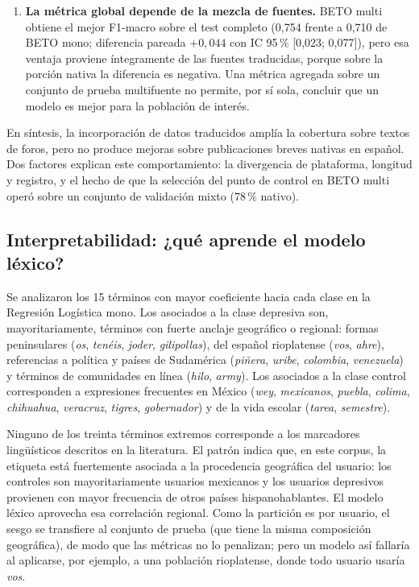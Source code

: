 \documentclass[12pt,a4paper]{article}
\begin{document}
\begin{enumerate}[leftmargin=2em]
    \item \textbf{La métrica global depende de la mezcla de fuentes.} BETO multi obtiene el mejor F1-macro sobre el test completo (0{,}754 frente a 0{,}710 de BETO mono; diferencia pareada $+0{,}044$ con IC 95\,\% [0{,}023; 0{,}077]), pero esa ventaja proviene íntegramente de las fuentes traducidas, porque sobre la porción nativa la diferencia es negativa. Una métrica agregada sobre un conjunto de prueba multifuente no permite, por sí sola, concluir que un modelo es mejor para la población de interés.
\end{enumerate}

En síntesis, la incorporación de datos traducidos amplía la cobertura sobre textos de foros, pero no produce mejoras sobre publicaciones breves nativas en español. Dos factores explican este comportamiento: la divergencia de plataforma, longitud y registro, y el hecho de que la selección del punto de control en BETO multi operó sobre un conjunto de validación mixto (78\,\% nativo).

\subsection{Interpretabilidad: ¿qué aprende el modelo léxico?}
Se analizaron los 15 términos con mayor coeficiente hacia cada clase en la Regresión Logística mono. Los asociados a la clase depresiva son, mayoritariamente, términos con fuerte anclaje geográfico o regional: formas peninsulares (\emph{os}, \emph{tenéis}, \emph{joder}, \emph{gilipollas}), del español rioplatense (\emph{vos}, \emph{ahre}), referencias a política y países de Sudamérica (\emph{piñera}, \emph{uribe}, \emph{colombia}, \emph{venezuela}) y términos de comunidades en línea (\emph{hilo}, \emph{army}). Los asociados a la clase control corresponden a expresiones frecuentes en México (\emph{wey}, \emph{mexicanos}, \emph{puebla}, \emph{colima}, \emph{chihuahua}, \emph{veracruz}, \emph{tigres}, \emph{gobernador}) y de la vida escolar (\emph{tarea}, \emph{semestre}).

Ninguno de los treinta términos extremos corresponde a los marcadores lingüísticos descritos en la literatura. El patrón indica que, en este corpus, la etiqueta está fuertemente asociada a la procedencia geográfica del usuario: los controles son mayoritariamente usuarios mexicanos y los usuarios depresivos provienen con mayor frecuencia de otros países hispanohablantes. El modelo léxico aprovecha esa correlación regional. Como la partición es por usuario, el sesgo se transfiere al conjunto de prueba (que tiene la misma composición geográfica), de modo que las métricas no lo penalizan; pero un modelo así fallaría al aplicarse, por ejemplo, a una población rioplatense, donde todo usuario usaría \emph{vos}.
\end{document}
